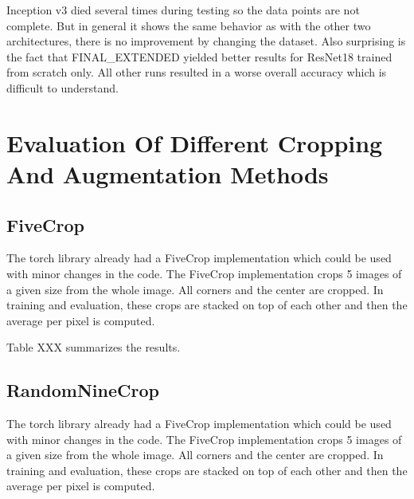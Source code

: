 Inception v3 died several times during testing so the data points are not complete. But in general it shows the same behavior as with the other two architectures, there is no improvement by changing the dataset. Also surprising is the fact that FINAL\_EXTENDED yielded better results for ResNet18 trained from scratch only. All other runs resulted in a worse overall accuracy which is difficult to understand.

\section{Evaluation Of Different Cropping And Augmentation Methods}

\subsection{FiveCrop}

The torch library already had a FiveCrop implementation which could be used with minor changes in the code. The FiveCrop implementation crops 5 images of a given size from the whole image. All corners and the center are cropped. In training and evaluation, these crops are stacked on top of each other and then the average per pixel is computed.

Table XXX summarizes the results.

\begin{table}[h] \centering
{}
\caption{Resnet18 FiveCrop Implementation with and without pre-training. FINAL (regular) means ResNet18 with the resizing of the image instead of cropping and averaging}
\label{tbl:resnet18-fivecrop}
\end{table}

\subsection{RandomNineCrop}

The torch library already had a FiveCrop implementation which could be used with minor changes in the code. The FiveCrop implementation crops 5 images of a given size from the whole image. All corners and the center are cropped. In training and evaluation, these crops are stacked on top of each other and then the average per pixel is computed.

